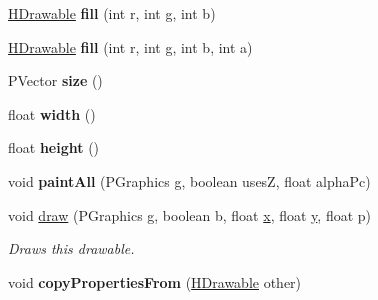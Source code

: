 \begin{DoxyCompactItemize}
\item 
\hypertarget{classhype_1_1core_1_1drawable_1_1_h_stage_a37373a040b1e238280c7ef669b4daa8f}{\hyperlink{classhype_1_1core_1_1drawable_1_1_h_drawable}{H\-Drawable} {\bfseries fill} (int r, int g, int b)}\label{classhype_1_1core_1_1drawable_1_1_h_stage_a37373a040b1e238280c7ef669b4daa8f}

\item 
\hypertarget{classhype_1_1core_1_1drawable_1_1_h_stage_aea67aaf8b964bb34aa7a6ed4a3b1bd68}{\hyperlink{classhype_1_1core_1_1drawable_1_1_h_drawable}{H\-Drawable} {\bfseries fill} (int r, int g, int b, int a)}\label{classhype_1_1core_1_1drawable_1_1_h_stage_aea67aaf8b964bb34aa7a6ed4a3b1bd68}

\item 
\hypertarget{classhype_1_1core_1_1drawable_1_1_h_stage_aa3a96b32e17b98ccb175dbcc391f6e23}{P\-Vector {\bfseries size} ()}\label{classhype_1_1core_1_1drawable_1_1_h_stage_aa3a96b32e17b98ccb175dbcc391f6e23}

\item 
\hypertarget{classhype_1_1core_1_1drawable_1_1_h_stage_a5e5e4b4181e3e680d9abed0cae38080c}{float {\bfseries width} ()}\label{classhype_1_1core_1_1drawable_1_1_h_stage_a5e5e4b4181e3e680d9abed0cae38080c}

\item 
\hypertarget{classhype_1_1core_1_1drawable_1_1_h_stage_a43b8ae2169c3b9df8714c9380b48cd67}{float {\bfseries height} ()}\label{classhype_1_1core_1_1drawable_1_1_h_stage_a43b8ae2169c3b9df8714c9380b48cd67}

\item 
\hypertarget{classhype_1_1core_1_1drawable_1_1_h_stage_aa768839177687e105f78c6769bbfcb0b}{void {\bfseries paint\-All} (P\-Graphics g, boolean uses\-Z, float alpha\-Pc)}\label{classhype_1_1core_1_1drawable_1_1_h_stage_aa768839177687e105f78c6769bbfcb0b}

\item 
void \hyperlink{classhype_1_1core_1_1drawable_1_1_h_stage_a94a4f90ed568346075c188979ed7b257}{draw} (P\-Graphics g, boolean b, float \hyperlink{classhype_1_1core_1_1drawable_1_1_h_stage_a40c96e01d80934ec54a3d816155af657}{x}, float \hyperlink{classhype_1_1core_1_1drawable_1_1_h_stage_a7d42de97ce129b1a563a04f993f3b4de}{y}, float p)
\begin{DoxyCompactList}\small\item\em Draws this drawable. \end{DoxyCompactList}\item 
\hypertarget{classhype_1_1core_1_1drawable_1_1_h_stage_a9e01df5af2c8466f370a3681c384f757}{void {\bfseries copy\-Properties\-From} (\hyperlink{classhype_1_1core_1_1drawable_1_1_h_drawable}{H\-Drawable} other)}\label{classhype_1_1core_1_1drawable_1_1_h_stage_a9e01df5af2c8466f370a3681c384f757}


\end{DoxyCompactItemize}

